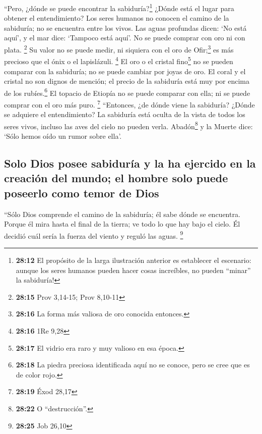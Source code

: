  ``Pero, ¿dónde se puede encontrar la
sabiduría?\footnote{\textbf{28:12} El propósito de la larga ilustración
  anterior es establecer el escenario: aunque los seres humanos pueden
  hacer cosas increíbles, no pueden ``minar'' la sabiduría!} ¿Dónde está
el lugar para obtener el entendimiento?  Los seres
humanos no conocen el camino de la sabiduría; no se encuentra entre los
vivos.  Las aguas profundas dicen: `No está aquí', y el
mar dice: `Tampoco está aquí'.  No se puede comprar con
oro ni con plata. \footnote{\textbf{28:15} Prov 3,14-15; Prov 8,10-11}
 Su valor no se puede medir, ni siquiera con el oro de
Ofir;\footnote{\textbf{28:16} La forma más valiosa de oro conocida
  entonces.} es más precioso que el ónix o el lapislázuli. \footnote{\textbf{28:16}
  1Re 9,28}  El oro o el cristal fino\footnote{\textbf{28:17}
  El vidrio era raro y muy valioso en esa época.} no se pueden comparar
con la sabiduría; no se puede cambiar por joyas de oro. 
El coral y el cristal no son dignos de mención; el precio de la
sabiduría está muy por encima de los rubíes.\footnote{\textbf{28:18} La
  piedra preciosa identificada aquí no se conoce, pero se cree que es de
  color rojo.}  El topacio de Etiopía no se puede
comparar con ella; ni se puede comprar con el oro más puro. \footnote{\textbf{28:19}
  Éxod 28,17}  ``Entonces, ¿de dónde viene la sabiduría?
¿Dónde se adquiere el entendimiento?  La sabiduría está
oculta de la vista de todos los seres vivos, incluso las aves del cielo
no pueden verla.  Abadón\footnote{\textbf{28:22} O
  ``destrucción''.} y la Muerte dice: `Sólo hemos oído un rumor sobre
ella'.

\hypertarget{solo-dios-posee-sabiduruxeda-y-la-ha-ejercido-en-la-creaciuxf3n-del-mundo-el-hombre-solo-puede-poseerlo-como-temor-de-dios}{%
\subsection{Solo Dios posee sabiduría y la ha ejercido en la creación
del mundo; el hombre solo puede poseerlo como temor de
Dios}\label{solo-dios-posee-sabiduruxeda-y-la-ha-ejercido-en-la-creaciuxf3n-del-mundo-el-hombre-solo-puede-poseerlo-como-temor-de-dios}}

 ``Sólo Dios comprende el camino de la sabiduría; él sabe
dónde se encuentra.  Porque él mira hasta el final de la
tierra; ve todo lo que hay bajo el cielo.  Él decidió
cuál sería la fuerza del viento y reguló las aguas. \footnote{\textbf{28:25}
  Job 26,10}

